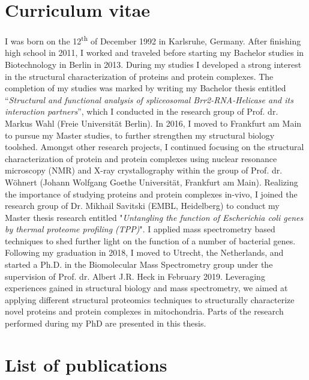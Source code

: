 \section{Curriculum vitae}
I was born on the 12\textsuperscript{th} of December 1992 in Karlsruhe, Germany. After finishing high school in 2011, I worked and traveled before starting my Bachelor studies in Biotechnology in Berlin in 2013. During my studies I developed a strong interest in the structural characterization of proteins and protein complexes. The completion of my studies was marked by writing my Bachelor thesis entitled “\emph{Structural and functional analysis of spliceosomal Brr2-RNA-Helicase and its interaction partners}”, which I conducted in the research group of Prof. dr. Markus Wahl (Freie Universität Berlin). In 2016, I moved to Frankfurt am Main to pursue my Master studies, to further strengthen my structural biology toolshed. Amongst other research projects, I continued focusing on the structural characterization of protein and protein complexes using nuclear resonance microscopy (NMR) and X-ray crystallography within the group of Prof. dr. Wöhnert (Johann Wolfgang Goethe Universität, Frankfurt am Main). Realizing the importance of studying proteins and protein complexes in-vivo, I joined the research group of Dr. Mikhail Savitski (EMBL, Heidelberg) to conduct my Master thesis research entitled "\emph{Untangling the function of Escherichia coli genes by thermal proteome profiling (TPP)}". I applied mass spectrometry based techniques to shed further light on the function of a number of bacterial genes. Following my graduation in 2018, I moved to Utrecht, the Netherlands, and started a Ph.D. in the Biomolecular Mass Spectrometry group under the supervision of Prof. dr. Albert J.R. Heck in February 2019. Leveraging experiences gained in structural biology and mass spectrometry, we aimed at applying different structural proteomics techniques to structurally characterize novel proteins and protein complexes in mitochondria. Parts of the research performed during my PhD are presented in this thesis.
\clearpage
\section{List of publications}
\nocite{*}


\clearpage
